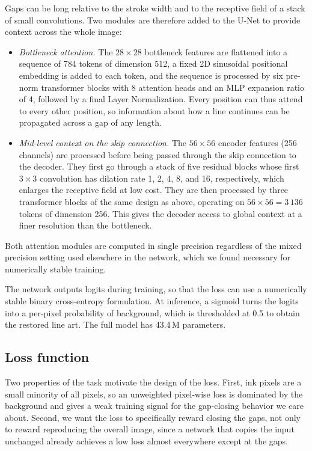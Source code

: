 \documentclass[preprint,12pt]{elsarticle}
\begin{document}
Gaps can be long relative to the stroke width and to the receptive field of a stack
of small convolutions. Two modules are therefore added to the U-Net to provide
context across the whole image:
\begin{itemize}
\item \emph{Bottleneck attention.} The $28\times 28$ bottleneck features are
  flattened into a sequence of 784 tokens of dimension 512, a fixed 2D sinusoidal
  positional embedding is added to each token, and the sequence is processed by six
  pre-norm transformer blocks \citep{vaswani2017attention} with 8 attention heads
  and an MLP expansion ratio of 4, followed by a final Layer Normalization. Every
  position can thus attend to every other position, so information about how a
  line continues can be propagated across a gap of any length.
\item \emph{Mid-level context on the skip connection.} The $56\times 56$ encoder
  features (256 channels) are processed before being passed through the skip
  connection to the decoder. They first go through a stack of five residual blocks
  whose first $3\times 3$ convolution has dilation rate 1, 2, 4, 8, and 16,
  respectively, which enlarges the receptive field at low cost. They are then
  processed by three transformer blocks of the same design as above, operating on
  $56\times 56 = 3\,136$ tokens of dimension 256. This gives the decoder access to
  global context at a finer resolution than the bottleneck.
\end{itemize}
Both attention modules are computed in single precision regardless of the mixed
precision setting used elsewhere in the network, which we found necessary for
numerically stable training.

The network outputs logits during training, so that the loss can use a numerically
stable binary cross-entropy formulation. At inference, a sigmoid turns the logits
into a per-pixel probability of background, which is thresholded at 0.5 to obtain
the restored line art. The full model has 43.4\,M parameters.

\subsection{Loss function}

Two properties of the task motivate the design of the loss. First, ink pixels are a
small minority of all pixels, so an unweighted pixel-wise loss is dominated by the
background and gives a weak training signal for the gap-closing behavior we care
about. Second, we want the loss to specifically reward closing the gaps, not only
to reward reproducing the overall image, since a network that copies the input
unchanged already achieves a low loss almost everywhere except at the gaps.
\end{document}
